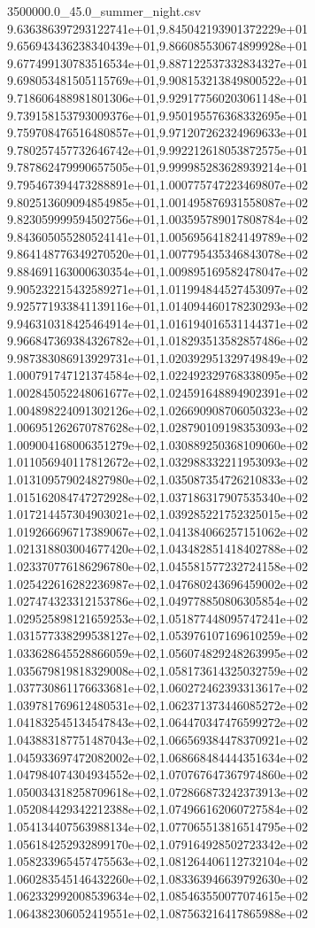 \begin{filecontents*}{3500000.0_45.0_summer_night.csv}
9.636386397293122741e+01,9.845042193901372229e+01
9.656943436238340439e+01,9.866085530674899928e+01
9.677499130783516534e+01,9.887122537332834327e+01
9.698053481505115769e+01,9.908153213849800522e+01
9.718606488981801306e+01,9.929177560203061148e+01
9.739158153793009376e+01,9.950195576368332695e+01
9.759708476516480857e+01,9.971207262324969633e+01
9.780257457732646742e+01,9.992212618053872575e+01
9.787862479990657505e+01,9.999985283628939214e+01
9.795467394473288891e+01,1.000775747223469807e+02
9.802513609094854985e+01,1.001495876931558087e+02
9.823059999594502756e+01,1.003595789017808784e+02
9.843605055280524141e+01,1.005695641824149789e+02
9.864148776349270520e+01,1.007795435346843078e+02
9.884691163000630354e+01,1.009895169582478047e+02
9.905232215432589271e+01,1.011994844527453097e+02
9.925771933841139116e+01,1.014094460178230293e+02
9.946310318425464914e+01,1.016194016531144371e+02
9.966847369384326782e+01,1.018293513582857486e+02
9.987383086913929731e+01,1.020392951329749849e+02
1.000791747121374584e+02,1.022492329768338095e+02
1.002845052248061677e+02,1.024591648894902391e+02
1.004898224091302126e+02,1.026690908706050323e+02
1.006951262670787628e+02,1.028790109198353093e+02
1.009004168006351279e+02,1.030889250368109060e+02
1.011056940117812672e+02,1.032988332211953093e+02
1.013109579024827980e+02,1.035087354726210833e+02
1.015162084747272928e+02,1.037186317907535340e+02
1.017214457304903021e+02,1.039285221752325015e+02
1.019266696717389067e+02,1.041384066257151062e+02
1.021318803004677420e+02,1.043482851418402788e+02
1.023370776186296780e+02,1.045581577232724158e+02
1.025422616282236987e+02,1.047680243696459002e+02
1.027474323312153786e+02,1.049778850806305854e+02
1.029525898121659253e+02,1.051877448095747241e+02
1.031577338299538127e+02,1.053976107169610259e+02
1.033628645528866059e+02,1.056074829248263995e+02
1.035679819818329008e+02,1.058173614325032759e+02
1.037730861176633681e+02,1.060272462393313617e+02
1.039781769612480531e+02,1.062371373446085272e+02
1.041832545134547843e+02,1.064470347476599272e+02
1.043883187751487043e+02,1.066569384478370921e+02
1.045933697472082002e+02,1.068668484444351634e+02
1.047984074304934552e+02,1.070767647367974860e+02
1.050034318258709618e+02,1.072866873242373913e+02
1.052084429342212388e+02,1.074966162060727584e+02
1.054134407563988134e+02,1.077065513816514795e+02
1.056184252932899170e+02,1.079164928502723342e+02
1.058233965457475563e+02,1.081264406112732104e+02
1.060283545146432260e+02,1.083363946639792630e+02
1.062332992008539634e+02,1.085463550077074615e+02
1.064382306052419551e+02,1.087563216417865988e+02

\end{filecontents*}
